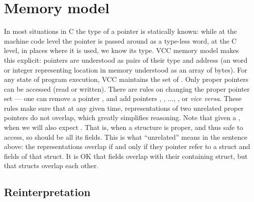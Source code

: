 \section{Memory model}
\label{sect:memmodel}

In most situations in C the type of a pointer is statically known:
while at the machine code level the pointer is passed around as a type-less
word, at the C level, in places where it is used, we know its type.
VCC memory model makes this explicit: pointers are understood as pairs
of their type and address (an word or integer representing location in memory
understood as an array of bytes).
For any state of program execution, VCC maintains the set of .
Only proper pointers can be accessed (read or written).
There are rules on changing the proper pointer set --- \eg one can remove
a pointer , and add pointers , ,
..., , or \textit{vice versa}.
These rules make sure that at any given time, representations of two
unrelated proper pointers do not overlap, which greatly simplifies reasoning.
Note that given a , when 
we will also expect .
That is, when a structure is proper, and thus safe to access, so should
be all its fields.
This is what ``unrelated'' means in the sentence above:
the representations overlap if and only if they pointer refer to a struct
and fields of that struct.
It is OK that fields overlap with their containing struct, but that
structs overlap each other.

\subsection{Reinterpretation}
\label{sect:reint}
